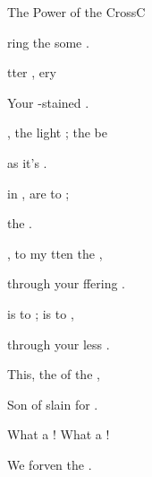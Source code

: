 \documentclass[12pt]{book}
\begin{document}
\begin{song}{The Power of the Cross}{C}{}{}{}{}
\begin{SBVerse}
        ring the some
              .

         tter , 
            ery  

         Your -stained .

    \end{SBVerse}

    \begin{SBVerse}
        
        , the light ; 
             the  be

         as it's 
              .

          in , 
             are  to ;

         the  .

    \end{SBVerse}

    \begin{SBVerse}
        
        , to  my  
            tten  the , 

         through your ffering 
              .

         is  to ;
             is  to ,

         through your less .

    \end{SBVerse}

    \begin{SBChorus}

        This, the  of the ,

        Son of  slain for .

        What a ! What a !

        We  forven  the . 
            \Ch{[Am}{}  \Ch{C]}{}

    \end{SBChorus}


\end{song}
\end{document}
